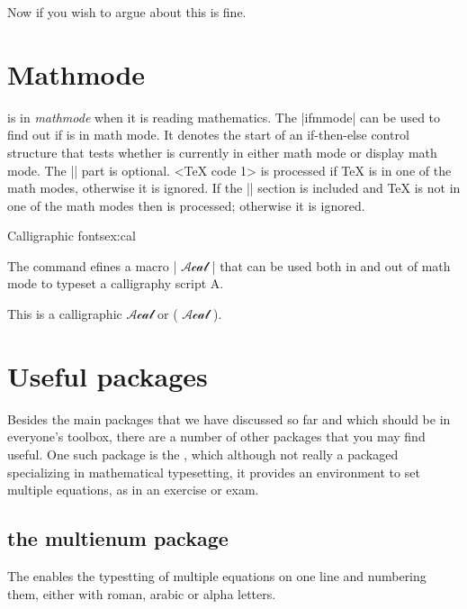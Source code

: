 {Now if you wish to argue about this is fine.

\section{Mathmode}

\tex is in \textit{mathmode} when it is reading mathematics. The |ifmmode| can be used to find out if \tex is in math mode. It denotes the start of an if-then-else control structure that tests whether \tex is currently in either math mode or display math mode. The |\else| part is optional. <TeX code 1> is processed if TeX is in one of the math modes, otherwise it is ignored. 
If the |\else| section is included and TeX is not in one of the math modes then  is processed; otherwise it is ignored.


\begin{texexample}{Calligraphic fonts}{ex:cal}

\newcommand{\Acal}{\ifmmode \mathcal{Acal} \else \(\) \fi}
The command efines a macro |\Acal| that can be used both in and out of math mode to typeset a calligraphy script A. 

This is a calligraphic {\Acal} or ({\Acal}).
\end{texexample}


\section{Useful packages}

Besides the main packages that we have discussed so far and which should be in everyone's toolbox, there are a number of other packages that you may find useful. One such package is the , which although not really a packaged specializing in mathematical typesetting, it provides an environment to set multiple equations, as in an exercise or exam.



\subsection{the multienum package}

The  enables  the typestting of multiple equations on one line and numbering them, either with roman, arabic or alpha letters.

}
